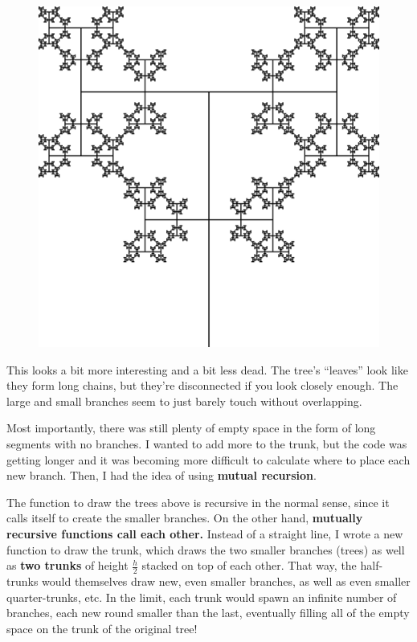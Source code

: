 \documentclass{article}
\begin{document}
\begin{figure}[H]
  \centering
  \includegraphics[scale=0.125]{quaternary_tree.png}
\end{figure}
This looks a bit more interesting and a bit less dead.
The tree's ``leaves'' look like they form long chains,
but they're disconnected if you look closely enough.
The large and small branches seem to just barely touch without overlapping.

Most importantly, there was still plenty of empty space
in the form of long segments with no branches.
I wanted to add more to the trunk,
but the code was getting longer
and it was becoming more difficult to calculate where to place each new branch.
Then, I had the idea of using \textbf{mutual recursion}.

The function to draw the trees above is recursive in the normal sense,
since it calls itself to create the smaller branches.
On the other hand,
\textbf{mutually recursive functions call each other.}
Instead of a straight line,
I wrote a new function to draw the trunk,
which draws the two smaller branches (trees)
as well as \textbf{two trunks} of height $\frac{h}{2}$
stacked on top of each other.
That way, the half-trunks
would themselves draw new, even smaller branches,
as well as even smaller quarter-trunks, etc.
In the limit, each trunk would spawn an infinite number of branches,
each new round smaller than the last,
eventually filling all of the empty space on the trunk of the original tree!
\end{document}
